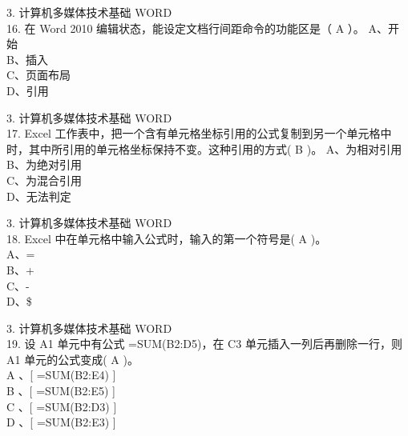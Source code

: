 \documentclass[aspectratio=169]{beamer}
\begin{document}
\begin{frame}[t]{3. 计算机多媒体技术基础} \vspace{20pt}
    WORD\\


16. 在 Word 2010 编辑状态，能设定文档行间距命令的功能区是（ A ）。
A、开始\\B、插入\\ C、页面布局\\ D、引用\\
\end{frame}


\begin{frame}[t]{3. 计算机多媒体技术基础} \vspace{20pt}
    WORD\\


17. Excel 工作表中，把一个含有单元格坐标引用的公式复制到另一个单元格中时，其中所引用的单元格坐标保持不变。这种引用的方式( B )。
A、为相对引用\\ B、为绝对引用 \\C、为混合引用\\ D、无法判定\\
\end{frame}


\begin{frame}[t]{3. 计算机多媒体技术基础} \vspace{20pt}
    WORD\\
18. Excel 中在单元格中输入公式时，输入的第一个符号是( A )。\\
A、=\\ B、+\\ C、-\\ D、\$\\
\end{frame}


\begin{frame}[t]{3. 计算机多媒体技术基础} \vspace{20pt}
    WORD\\

19. 设 A1 单元中有公式 =SUM(B2:D5)，在 C3 单元插入一列后再删除一行，则 A1 单元的公式变成( A )。\\
    A 、[ =SUM(B2:E4) ]\\
    B 、[ =SUM(B2:E5) ]\\
    C 、[ =SUM(B2:D3) ] \\
    D 、[ =SUM(B2:E3) ]  \\
\end{frame}
\end{document}
